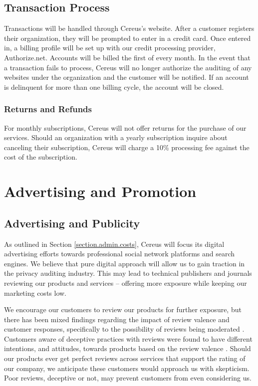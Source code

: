 \subsection{Transaction Process} \label{transaction.process}

Transactions will be handled through Cereus's website. After a customer registers their organization, they will be prompted to enter in a credit card. Once entered in, a billing profile will be set up with our credit processing provider, Authorize.net. Accounts will be billed the first of every month. In the event that a transaction fails to process, Cereus will no longer authorize the auditing of any websites under the organization and the customer will be notified. If an account is delinquent for more than one billing cycle, the account will be closed.

\subsubsection{Returns and Refunds}

For monthly subscriptions, Cereus will not offer returns for the purchase of our services. Should an organization with a yearly subscription inquire about canceling their subscription, Cereus will charge a 10\% processing fee against the cost of the subscription.



\section{Advertising and Promotion} \label{marketing.ad.promo}

\subsection{Advertising and Publicity}

As outlined in Section \ref{section.admin.costs}, Cereus will focus its digital advertising efforts towards professional social network platforms and search engines. We believe that pure digital approach will allow us to gain traction in the privacy auditing industry. This may lead to technical publishers and journals reviewing our products and services -- offering more exposure while keeping our marketing costs low.

We encourage our customers to review our products for further exposure, but there has been mixed findings regarding the impact of review valence and customer responses, specifically to the possibility of reviews being moderated \cite{maslowska.reviews.2017}. Customers aware of deceptive practices with reviews were found to have different intentions, and attitudes, towards products based on the review valence \cite{karabas.reviews.2020}. Should our products ever get perfect reviews across services that support the rating of our company, we anticipate these customers would approach us with skepticism. Poor reviews, deceptive or not, may prevent customers from even considering us.

